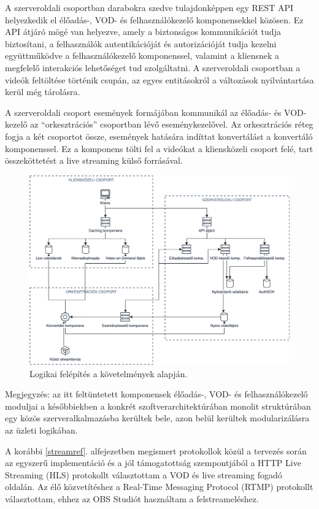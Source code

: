 A szerveroldali csoportban darabokra szedve tulajdonképpen egy REST API helyezkedik el élőadás-, VOD- és felhasználókezelő komponensekkel közösen. Ez API átjáró mögé van helyezve, amely a biztonságos kommunikációt tudja biztosítani, a felhasználók autentikációját és autorizációját tudja kezelni együttműködve a felhasználókezelő komponenssel, valamint a kliensnek a megfelelő interakciós lehetőséget tud szolgáltatni. A szerveroldali csoportban a videók feltöltése történik csupán, az egyes entitásokról a változások nyilvántartása kerül még tárolásra.

A szerveroldali csoport események formájában kommunikál az élőadás- és VOD-kezelő az ``orkesztrációs'' csoportban lévő eseménykezelővel. Az orkesztrációs réteg fogja a két csoportot össze, események hatására indíttat konvertálást a konvertáló komponenssel. Ez a komponens tölti fel a videókat a kliensközeli csoport felé, tart összeköttetést a live streaming külső forrásával.

\begin{figure}[ht]
	\centering
	\includegraphics[width=140mm, keepaspectratio]{figures/dipterv_highlevel.png}
	\caption{Logikai felépítés a követelmények alapján.}
	\label{fig:highlevel}
\end{figure}

Megjegyzés: az itt feltüntetett komponensek élőadás-, VOD- és felhasználókezelő moduljai a későbbiekben a konkrét szoftverarchitektúrában monolit struktúrában egy közös szerveralkalmazásba kerültek bele, azon belül kerültek modularizálásra az üzleti logikában.

A korábbi \ref{streamref}. alfejezetben megismert protokollok közül a tervezés során az egyszerű implementáció és a jól támogatottság szempontjából a HTTP Live Streaming (HLS) protokollt választottam a VOD és live streaming fogadó oldalán. Az élő közvetítéshez a Real-Time Messaging Protocol (RTMP) protokollt választottam, ehhez az OBS Studiót használtam a felstreameléshez.

